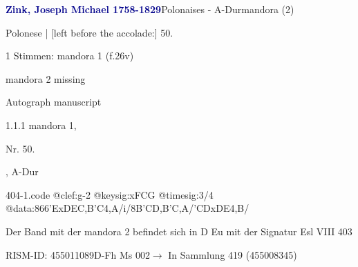 \documentclass[twocolumn]{book}
\begin{document}
\par \vspace{7pt} \textcolor{darkblue}{\textbf{Zink, Joseph Michael  1758-1829}}\hfillplus{\textbf{[404]}}\newline Polonaises - A-Dur\newline mandora (2)
\par \begin{itshape}[f.26v, at left:] Polonese | [left before the accolade:] 50.\end{itshape} 
\par \textcolor{darkblue}{}  1 Stimmen: mandora 1  (f.26v)\newline \begin{small} mandora 2 missing\end{small} \newline Autograph manuscript
\par 1.1.1  mandora 1, \begin{itshape}Nr. 50.\end{itshape}, A-Dur  
\begin{filecontents*}{404-1.code}
@clef:g-2
@keysig:xFCG
@timesig:3/4
@data:{866'ExDE}{C,B'C}4,A/i/8{B'C}{D,B}{'C,A}/{'CD}{xDE}4,B/
\end{filecontents*}
\newline
%
\par Der Band mit der mandora 2 befindet sich in D Eu mit der Signatur Esl VIII 403
\par RISM-ID: 455011089\newline D-Fh  Ms 002\newline $\rightarrow$ In Sammlung 419 (455008345)
      
\end{document}
